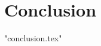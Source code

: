 %

\let\textcircled=\pgftextcircled
\chapter{Conclusion}
\label{chap:conclusion}


{"conclusion.tex"}
